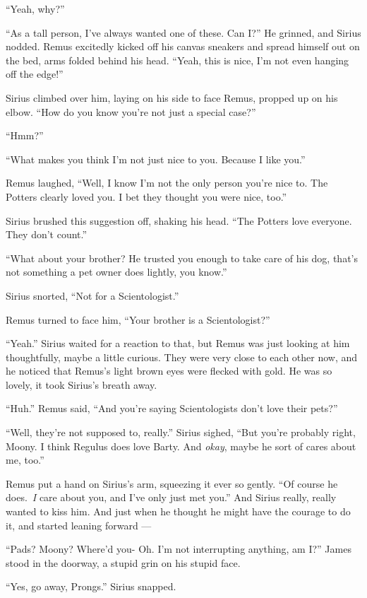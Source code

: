 \documentclass[12pt,twoside,openright]{memoir}
\begin{document}
``Yeah, why?''

``As a tall person, I've always wanted one of these. Can I?'' He grinned, and Sirius nodded. Remus excitedly kicked off his canvas sneakers and spread himself out on the bed, arms folded behind his head. ``Yeah, this is nice, I'm not even hanging off the edge!''

Sirius climbed over him, laying on his side to face Remus, propped up on his elbow. ``How do you know you're not just a special case?''

``Hmm?''

``What makes you think I'm not just nice to you. Because I like you.''

Remus laughed, ``Well, I know I'm not the only person you're nice to. The Potters clearly loved you. I bet they thought you were nice, too.''

Sirius brushed this suggestion off, shaking his head. ``The Potters love everyone. They don't count.''

``What about your brother? He trusted you enough to take care of his dog, that's not something a pet owner does lightly, you know.''

Sirius snorted, ``Not for a Scientologist.''

Remus turned to face him, ``Your brother is a Scientologist?''

``Yeah.'' Sirius waited for a reaction to that, but Remus was just looking at him thoughtfully, maybe a little curious. They were very close to each other now, and he noticed that Remus's light brown eyes were flecked with gold. He was so lovely, it took Sirius's breath away.

``Huh.'' Remus said, ``And you're saying Scientologists don't love their pets?''

``Well, they're not supposed to, really.'' Sirius sighed, ``But you're probably right, Moony. I think Regulus does love Barty. And \textit{okay}, maybe he sort of cares about me, too.''

Remus put a hand on Sirius's arm, squeezing it ever so gently. ``Of course he does.\ \textit{I} care about you, and I've only just met you.'' And Sirius really, really wanted to kiss him. And just when he thought he might have the courage to do it, and started leaning forward ---

``Pads? Moony? Where'd you- Oh. I'm not interrupting anything, am I?'' James stood in the doorway, a stupid grin on his stupid face.

``Yes, go away, Prongs.'' Sirius snapped.
\end{document}
